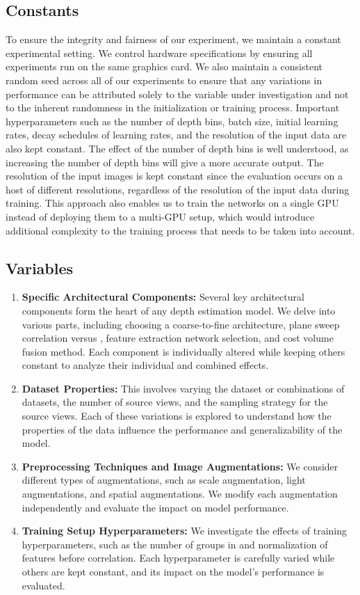 \subsection{Constants}

To ensure the integrity and fairness of our experiment, we maintain a constant experimental setting. We control hardware specifications by ensuring all experiments run on the same graphics card. We also maintain a consistent random seed across all of our experiments to ensure that any variations in performance can be attributed solely to the variable under investigation and not to the inherent randomness in the initialization or training process. Important hyperparameters such as the number of depth bins, batch size, initial learning rates, decay schedules of learning rates, and the resolution of the input data are also kept constant. The effect of the number of depth bins is well understood, as increasing the number of depth bins will give a more accurate output. The resolution of the input images is kept constant since the evaluation occurs on a host of different resolutions, regardless of the resolution of the input data during training. This approach also enables us to train the networks on a single GPU instead of deploying them to a multi-GPU setup, which would introduce additional complexity to the training process that needs to be taken into account.
\subsection{Variables}
\begin{enumerate}
    \item \textbf{Specific Architectural Components:} Several key architectural components form the heart of any depth estimation model. We delve into various parts, including choosing a coarse-to-fine architecture, plane sweep correlation versus {\gwc}, feature extraction network selection, and cost volume fusion method. Each component is individually altered while keeping others constant to analyze their individual and combined effects. 
    \item \textbf{Dataset Properties:} This involves varying the dataset or combinations of datasets, the number of source views, and the sampling strategy for the source views. Each of these variations is explored to understand how the properties of the data influence the performance and generalizability of the model.

    \item \textbf{Preprocessing Techniques and Image Augmentations:} We consider different types of augmentations, such as scale augmentation, light augmentations, and spatial augmentations. We modify each augmentation independently and evaluate the impact on model performance.

    \item \textbf{Training Setup Hyperparameters:} We investigate the effects of training hyperparameters, such as the number of groups in {\gwc} and normalization of features before correlation. Each hyperparameter is carefully varied while others are kept constant, and its impact on the model's performance is evaluated.
\end{enumerate}

